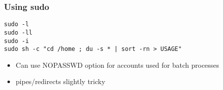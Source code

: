 \begin{frame}[fragile]
	\frametitle{Using sudo}
	\begin{lstlisting}
sudo -l
sudo -ll
sudo -i
sudo sh -c "cd /home ; du -s * | sort -rn > USAGE"
        \end{lstlisting}
  \begin{itemize}
    	\item Can use NOPASSWD option for accounts used for batch processes
	\item pipes/redirects slightly tricky
  \end{itemize} 

\end{frame}
